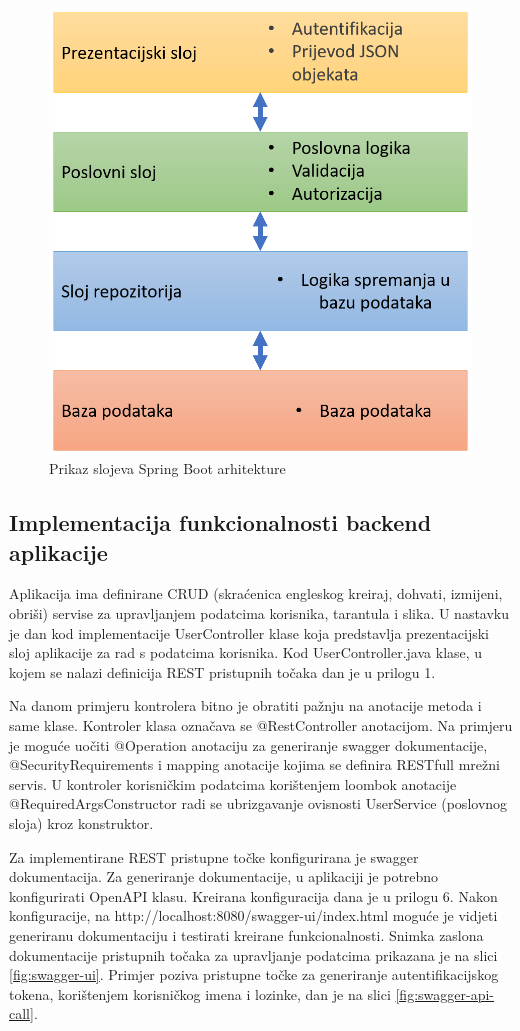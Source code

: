 \documentclass[a4paper,12pt,oneside]{article}
\begin{document}
\begin{figure}
    \centering
    \includegraphics[width=0.5\linewidth]{Slike/springMvcLogic.png}
    \caption{Prikaz slojeva Spring Boot arhitekture \cite{springArchitectureLayers}}
    \label{fig:dijagram-arch-apk}
\end{figure}




\subsection{Implementacija funkcionalnosti backend aplikacije}

Aplikacija ima definirane CRUD (skraćenica engleskog kreiraj, dohvati, izmijeni, obriši) servise za upravljanjem podatcima korisnika, tarantula i slika. U nastavku je dan kod implementacije UserController klase koja predstavlja prezentacijski sloj aplikacije za rad s podatcima korisnika. Kod UserController.java klase, u kojem se nalazi definicija REST pristupnih točaka dan je u prilogu 1.




Na danom primjeru kontrolera bitno je obratiti pažnju na anotacije metoda i same klase. Kontroler klasa označava se @RestController anotacijom. Na primjeru je moguće uočiti @Operation anotaciju za generiranje swagger dokumentacije, @SecurityRequirements i mapping anotacije kojima se definira RESTfull mrežni servis. U kontroler korisničkim podatcima korištenjem loombok anotacije @RequiredArgsConstructor radi se ubrizgavanje ovisnosti UserService (poslovnog sloja) kroz konstruktor.

Za implementirane REST pristupne točke konfigurirana je swagger dokumentacija. Za generiranje dokumentacije, u aplikaciji je potrebno konfigurirati OpenAPI klasu. Kreirana konfiguracija dana je u prilogu 6. Nakon konfiguracije, na http://localhost:8080/swagger-ui/index.html moguće je vidjeti generiranu dokumentaciju i testirati kreirane funkcionalnosti. Snimka zaslona dokumentacije pristupnih točaka za upravljanje podatcima prikazana je na slici \ref{fig:swagger-ui}. Primjer poziva pristupne točke za generiranje autentifikacijskog tokena, korištenjem korisničkog imena i lozinke, dan je na slici \ref{fig:swagger-api-call}.
\end{document}
